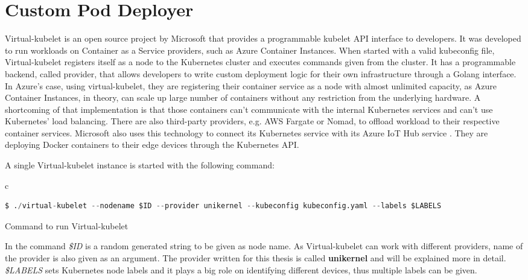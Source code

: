 \section{Custom Pod Deployer}
Virtual-kubelet is an open source project by Microsoft that provides a programmable kubelet API interface to developers. It was developed to run workloads on Container as a Service providers, such as Azure Container Instances. When started with a valid kubeconfig file, Virtual-kubelet registers itself as a node to the Kubernetes cluster and executes commands given from the cluster. It has a programmable backend, called provider, that allows developers to write custom deployment logic for their own infrastructure through a Golang interface. In Azure's case, using virtual-kubelet, they are registering their container service as a node with almost unlimited capacity, as Azure Container Instances, in theory, can scale up large number of containers without any restriction from the underlying hardware. A shortcoming of that implementation is that those containers can't communicate with the internal Kubernetes services and can't use Kubernetes' load balancing. There are also third-party providers, e.g. AWS Fargate or Nomad, to offload workload to their respective container services. Microsoft also uses this technology to connect its Kubernetes service with its Azure IoT Hub service \cite{Chandra2019}. They are deploying Docker containers to their edge devices through the Kubernetes API.

A single Virtual-kubelet instance is started with the following command:
\begin{code}[htpb]
  \centering
  \begin{tabular}{c}
    \begin{lstlisting}[language=python]
      $ ./virtual-kubelet --nodename $ID --provider unikernel --kubeconfig kubeconfig.yaml --labels $LABELS
      \end{lstlisting}
\end{tabular}
\caption{Command to run Virtual-kubelet}\label{lst:vkcommand}
\end{code}


In the command \textit{\$ID} is a random generated string to be given as node name. As Virtual-kubelet can work with different providers, name of the provider is also given as an argument. The provider written for this thesis is called \textbf{unikernel} and will be explained more in detail. \textit{\$LABELS} sets Kubernetes node labels and it plays a big role on identifying different devices, thus multiple labels can be given.

